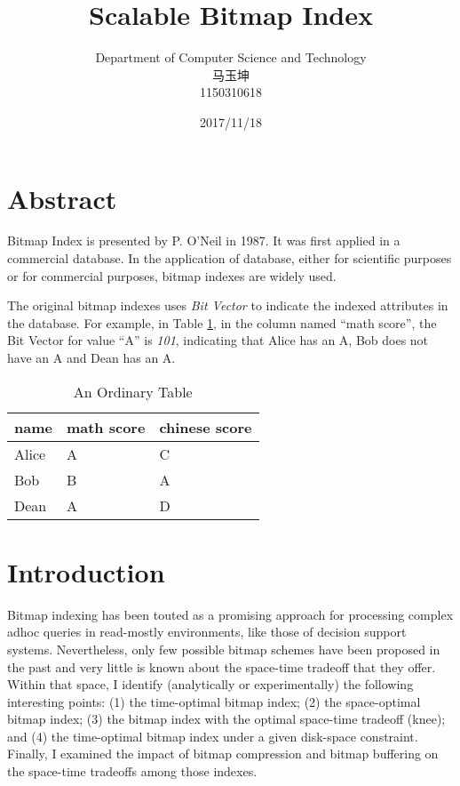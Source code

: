 \documentclass[12pt, a4paper]{article}
\begin{document}
\title{{\bf\Huge Scalable Bitmap Index}}
\author{Department of Computer Science and Technology\\马玉坤\\1150310618}
\date{2017/11/18}
\maketitle
\thispagestyle{empty}
\newpage

\section{Abstract}

Bitmap Index is presented by P. O'Neil in 1987. It was first applied in a commercial database. \citep{spiegler1985storage} In the application of database, either for scientific purposes or for commercial purposes, bitmap indexes are widely used.

The original bitmap indexes uses {\emph{Bit Vector}} to indicate the indexed attributes in the database. For example, in Table \ref{table:ordinary-table}, in the column named ``math score'', the Bit Vector for value ``A'' is {\emph{101}}, indicating that Alice has an A, Bob does not have an A and Dean has an A.

\begin{table}[H]
\centering
\caption{An Ordinary Table}
\label{table:ordinary-table}
\begin{tabular}{|l|l|l|}
\hline
name  & math score & chinese score \\ \hline
Alice & A          & C             \\ \hline
Bob   & B          & A             \\ \hline
Dean  & A          & D             \\ \hline
\end{tabular}
\end{table}

\section{Introduction}
Bitmap indexing has been touted as a promising approach for processing complex adhoc queries in read-mostly environments, like those of decision support systems. Nevertheless, only few possible bitmap schemes have been proposed in the past and very little is known about the space-time tradeoff that they offer. Within that space, I identify (analytically or experimentally) the following interesting points: (1) the time-optimal bitmap index; (2) the space-optimal bitmap index; (3) the bitmap index with the optimal space-time tradeoff (knee); and (4) the time-optimal bitmap index under a given disk-space constraint. Finally, I examined the impact of bitmap compression and bitmap buffering on the space-time tradeoffs among those indexes.
\end{document}
